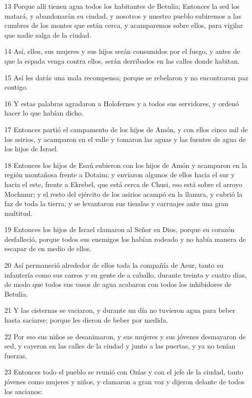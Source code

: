 \par 13 Porque allí tienen agua todos los habitantes de Betulia; Entonces la sed los matará, y abandonarán su ciudad, y nosotros y nuestro pueblo subiremos a las cumbres de los montes que están cerca, y acamparemos sobre ellos, para vigilar que nadie salga de la ciudad.
\par 14 Así, ellos, sus mujeres y sus hijos serán consumidos por el fuego, y antes de que la espada venga contra ellos, serán derribados en las calles donde habitan.
\par 15 Así les darás una mala recompensa; porque se rebelaron y no encontraron paz contigo.
\par 16 Y estas palabras agradaron a Holofernes y a todos sus servidores, y ordenó hacer lo que habían dicho.
\par 17 Entonces partió el campamento de los hijos de Amón, y con ellos cinco mil de los asirios, y acamparon en el valle y tomaron las aguas y las fuentes de agua de los hijos de Israel.
\par 18 Entonces los hijos de Esaú subieron con los hijos de Amón y acamparon en la región montañosa frente a Dotaim; y enviaron algunos de ellos hacia el sur y hacia el este, frente a Ekrebel, que está cerca de Chusi, eso está sobre el arroyo Mochmur; y el resto del ejército de los asirios acampó en la llanura, y cubrió la faz de toda la tierra; y se levantaron sus tiendas y carruajes ante una gran multitud.
\par 19 Entonces los hijos de Israel clamaron al Señor su Dios, porque su corazón desfalleció, porque todos sus enemigos los habían rodeado y no había manera de escapar de en medio de ellos.
\par 20 Así permaneció alrededor de ellos toda la compañía de Asur, tanto su infantería como sus carros y su gente de a caballo, durante treinta y cuatro días, de modo que todos sus vasos de agua acabaron con todos los inhibidores de Betulia.
\par 21 Y las cisternas se vaciaron, y durante un día no tuvieron agua para beber hasta saciarse; porque les dieron de beber por medida.
\par 22 Por eso sus niños se desanimaron, y sus mujeres y sus jóvenes desmayaron de sed, y cayeron en las calles de la ciudad y junto a las puertas, y ya no tenían fuerzas.
\par 23 Entonces todo el pueblo se reunió con Ozías y con el jefe de la ciudad, tanto jóvenes como mujeres y niños, y clamaron a gran voz y dijeron delante de todos los ancianos:
